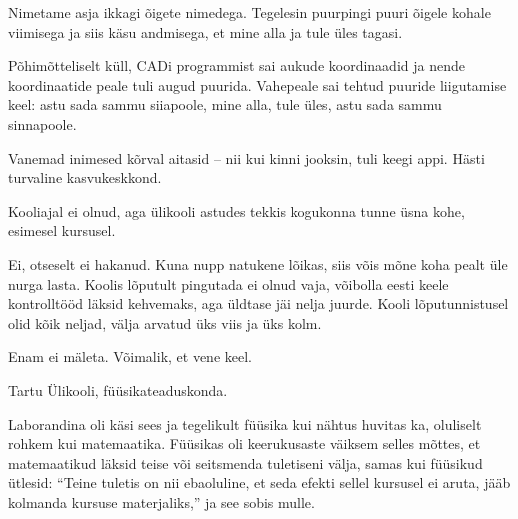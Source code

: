 
Nimetame asja ikkagi õigete nimedega. Tegelesin puurpingi puuri õigele kohale 
viimisega ja siis käsu andmisega, et mine alla ja tule üles tagasi.


Põhimõtteliselt küll, CADi programmist sai aukude koordinaadid 
ja nende koordinaatide peale tuli augud puurida. Vahepeale sai 
tehtud puuride liigutamise keel: astu sada sammu siiapoole, 
mine alla, tule üles, astu sada sammu sinnapoole.


Vanemad inimesed kõrval aitasid -- nii kui kinni jooksin, tuli 
keegi appi. Hästi turvaline kasvukeskkond.


Kooliajal ei olnud, aga ülikooli astudes tekkis kogukonna tunne 
üsna kohe, esimesel kursusel.


Ei, otseselt ei hakanud. Kuna nupp natukene lõikas, siis võis mõne koha pealt 
üle nurga lasta. Koolis lõputult pingutada ei olnud vaja, võibolla eesti 
keele kontrolltööd läksid kehvemaks, aga üldtase jäi nelja juurde. Kooli lõputunnistusel olid kõik neljad, välja 
arvatud üks viis ja üks kolm. 


Enam ei mäleta. Võimalik, et vene keel.


Tartu Ülikooli, füüsikateaduskonda.


Laborandina oli käsi sees ja tegelikult füüsika kui nähtus huvitas ka, 
oluliselt rohkem kui matemaatika. Füüsikas oli keerukusaste 
väiksem selles mõttes, et matemaatikud läksid teise või seitsmenda 
tuletiseni välja, samas kui füüsikud ütlesid: \enquote{Teine tuletis on nii 
ebaoluline, et seda efekti sellel kursusel ei aruta, jääb kolmanda kursuse 
materjaliks,} ja see sobis mulle.


